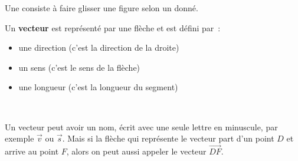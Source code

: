 

\begin{aconnaitre}
Une  consiste à faire glisser une figure selon un  donné.\\[0.5em]
\begin{minipage}[c]{0.62\linewidth}
Un \textbf{vecteur} est représenté par une flèche et est défini par :
\begin{itemize}
 \item une direction (c'est la direction de la droite)
 \item un sens (c'est le sens de la flèche)
 \item une longueur (c'est la longueur du segment)
 \end{itemize}
 \end{minipage} \hfill%
 \begin{minipage}[c]{0.34\linewidth}
 \begin{center}
 \end{center}
 \end{minipage} \\
\end{aconnaitre}

\begin{remarque}
 Un vecteur peut avoir un nom, écrit avec une seule lettre en minuscule, par exemple $\overrightarrow{v}$ ou $\overrightarrow{s}$. Mais si la flèche qui représente le vecteur part d'un point $D$ et arrive au point $F$, alors on peut aussi appeler le vecteur $\overrightarrow{DF}$.
\end{remarque}


